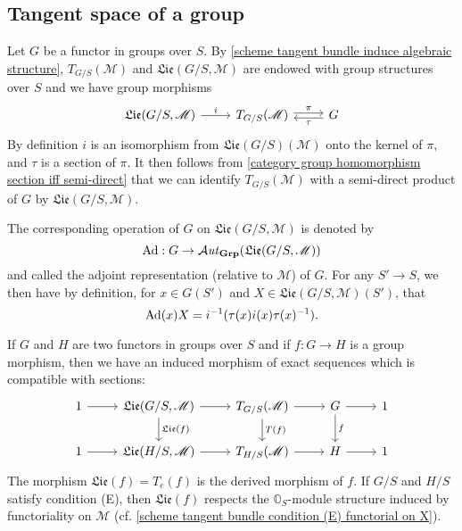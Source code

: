 \subsection{Tangent space of a group}
Let $G$ be a functor in groups over $S$. By \cref{scheme tangent bundle induce algebraic structure}, $T_{G/S}(\mathscr{M})$ and $\mathfrak{Lie}(G/S,\mathscr{M})$ are endowed with group structures over $S$ and we have group morphisms
\begin{equation}\label{scheme group tangent space and Lie split exact sequence}
\begin{tikzcd}
\mathfrak{Lie}(G/S,\mathscr{M})\ar[r,"i"]&T_{G/S}(\mathscr{M})\ar[r,shift left=2pt,"\pi"]&G\ar[l,shift left=2pt,"\tau"]
\end{tikzcd}
\end{equation}
By definition $i$ is an isomorphism from $\mathfrak{Lie}(G/S)(\mathscr{M})$ onto the kernel of $\pi$, and $\tau$ is a section of $\pi$. It then follows from \cref{category group homomorphism section iff semi-direct} that we can identify $T_{G/S}(\mathscr{M})$ with a semi-direct product of $G$ by $\mathfrak{Lie}(G/S,\mathscr{M})$.

\begin{definition}
The corresponding operation of $G$ on $\mathfrak{Lie}(G/S,\mathscr{M})$ is denoted by
\[\mathrm{Ad}:G\to\operatorname{\mathcal{A}\hspace*{-0.2pt}\textit{ut}\hspace{0.5pt}}_{\mathbf{Grp}}(\mathfrak{Lie}(G/S,\mathscr{M}))\]
and called the adjoint representation (relative to $\mathscr{M}$) of $G$. For any $S'\to S$, we then have by definition, for $x\in G(S')$ and $X\in\mathfrak{Lie}(G/S,\mathscr{M})(S')$, that
\[\mathrm{Ad}(x)X=i^{-1}(\tau(x)i(x)\tau(x)^{-1}).\]
\end{definition}
\begin{definition}
If $G$ and $H$ are two functors in groups over $S$ and if $f:G\to H$ is a group morphism, then we have an induced morphism of exact sequences which is compatible with sections:
\[\begin{tikzcd}
1\ar[r]&\mathfrak{Lie}(G/S,\mathscr{M})\ar[r]\ar[d,"\mathfrak{Lie}(f)"]&T_{G/S}(\mathscr{M})\ar[r]\ar[d,"T(f)"]&G\ar[r]\ar[d,"f"]&1\\
1\ar[r]&\mathfrak{Lie}(H/S,\mathscr{M})\ar[r]&T_{H/S}(\mathscr{M})\ar[r]&H\ar[r]&1
\end{tikzcd}\]
The morphism $\mathfrak{Lie}(f)=T_e(f)$ is the derived morphism of $f$. If $G/S$ and $H/S$ satisfy condition (E), then $\mathfrak{Lie}(f)$ respects the $\mathbb{O}_S$-module structure induced by functoriality on $\mathscr{M}$ (cf. \cref{scheme tangent bundle condition (E) functorial on X}).
\end{definition}

